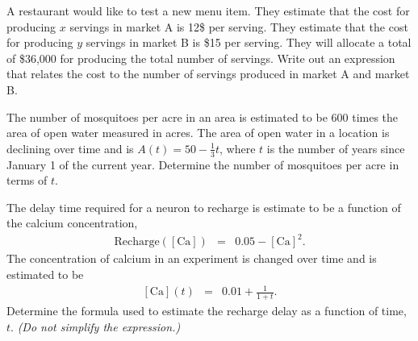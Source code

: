 
\begin{problem}
\item A restaurant would like to test a new menu item. They estimate
  that the cost for producing $x$ servings in market A is 12\$ per
  serving. They estimate that the cost for producing $y$ servings in
  market B is \$15 per serving.  They will allocate a total of
  \$36,000 for producing the total number of servings. Write out an
  expression that relates the cost to the number of servings produced
  in market A and market B.  
  \vfill
\item The number of mosquitoes per acre in an area is estimated to be
  600 times the area of open water measured in acres. The area of open
  water in a location is declining over time and is
  $A(t)=50-\frac{1}{3}t$, where $t$ is the number of years since
  January 1 of the current year. Determine the number of mosquitoes
  per acre in terms of $t$.
  \vfill
\item The delay time required for a neuron to recharge is estimate to
  be a function of the calcium concentration,
  \begin{eqnarray*}
    \mathrm{Recharge([Ca])} & = & 0.05-\mathrm{[Ca]}^2.
  \end{eqnarray*}
  The concentration of calcium in an experiment is changed over time
  and is estimated to be 
  \begin{eqnarray*}
    \mathrm{[Ca]}(t) & = & 0.01+\frac{1}{1+t}.
  \end{eqnarray*}
  Determine the formula used to estimate the recharge delay as a
  function of time, $t$. \textit{(Do not simplify the expression.)}
  \vfill
\end{problem}


